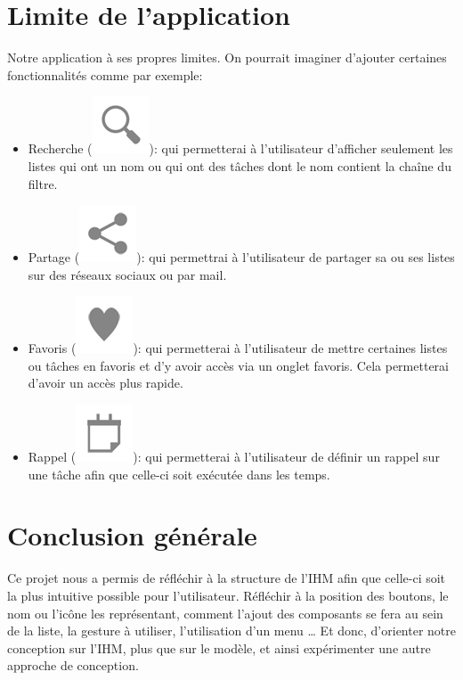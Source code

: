 \documentclass[a4paper,10pt]{article}
\begin{document}
\section{Limite de l'application}
Notre application à ses propres limites.
On pourrait imaginer d'ajouter certaines fonctionnalités comme par exemple:
\begin{itemize}
\item Recherche (\includegraphics[scale=0.2]{Images/search.png}): qui permetterai à l'utilisateur d'afficher seulement les listes qui ont un nom ou qui ont des tâches dont le nom contient la chaîne du filtre.
\item Partage (\includegraphics[scale=0.2]{Images/share.png}): qui permettrai à l'utilisateur de partager sa ou ses listes sur des réseaux sociaux ou par mail.
\item Favoris (\includegraphics[scale=0.2]{Images/favorite.png}): qui permetterai à l'utilisateur de mettre certaines listes ou tâches en favoris et d'y avoir accès via un onglet favoris. Cela permetterai d'avoir un accès plus rapide.
\item Rappel (\includegraphics[scale=0.2]{Images/event.png}): qui permetterai à l'utilisateur de définir un rappel sur une tâche afin que celle-ci soit exécutée dans les temps.
\end{itemize}

\newpage
\section{Conclusion générale}
Ce projet nous a permis de réfléchir à la structure de l'IHM afin que celle-ci soit la plus intuitive possible pour l'utilisateur. Réfléchir à la position des
boutons, le nom ou l'icône les représentant, comment l'ajout des composants se fera au sein de la liste, la gesture à utiliser, l'utilisation d'un menu \ldots{}
Et donc, d'orienter notre conception sur l'IHM, plus que sur le modèle, et ainsi expérimenter une autre approche de conception.
\end{document}
